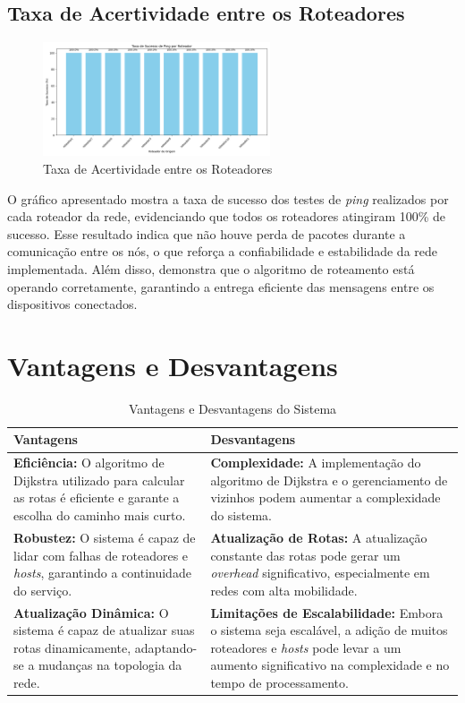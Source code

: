 \documentclass[12pt,a4paper]{report}
\begin{document}
\subsection{Taxa de Acertividade entre os Roteadores}
\begin{figure}[h!]
    \centering
    \includegraphics[width=0.6\textwidth]{grafico_taxa_sucesso.png}
    \caption{Taxa de Acertividade entre os Roteadores}
    \label{fig:barras}
\end{figure}

O gráfico apresentado mostra a taxa de sucesso dos testes de \textit{ping} realizados por cada roteador da rede, evidenciando que todos os roteadores atingiram 100\% de sucesso. Esse resultado indica que não houve perda de pacotes durante a comunicação entre os nós, o que reforça a confiabilidade e estabilidade da rede implementada. Além disso, demonstra que o algoritmo de roteamento está operando corretamente, garantindo a entrega eficiente das mensagens entre os dispositivos conectados.

\section{Vantagens e Desvantagens}
\begin{table}[h!]
\centering
\caption{Vantagens e Desvantagens do Sistema}
\begin{tabular}{|p{7cm}|p{7cm}|}
\hline
\textbf{Vantagens} & \textbf{Desvantagens} \\
\hline
\textbf{Eficiência:} O algoritmo de Dijkstra utilizado para calcular as rotas é eficiente e garante a escolha do caminho mais curto. 
& 
\textbf{Complexidade:} A implementação do algoritmo de Dijkstra e o gerenciamento de vizinhos podem aumentar a complexidade do sistema. \\
\hline
\textbf{Robustez:} O sistema é capaz de lidar com falhas de roteadores e \textit{hosts}, garantindo a continuidade do serviço.
&
\textbf{Atualização de Rotas:} A atualização constante das rotas pode gerar um \textit{overhead} significativo, especialmente em redes com alta mobilidade. \\
\hline
\textbf{Atualização Dinâmica:} O sistema é capaz de atualizar suas rotas dinamicamente, adaptando-se a mudanças na topologia da rede.
&
\textbf{Limitações de Escalabilidade:} Embora o sistema seja escalável, a adição de muitos roteadores e \textit{hosts} pode levar a um aumento significativo na complexidade e no tempo de processamento. \\
\hline
\end{tabular}
\end{table}
\end{document}
